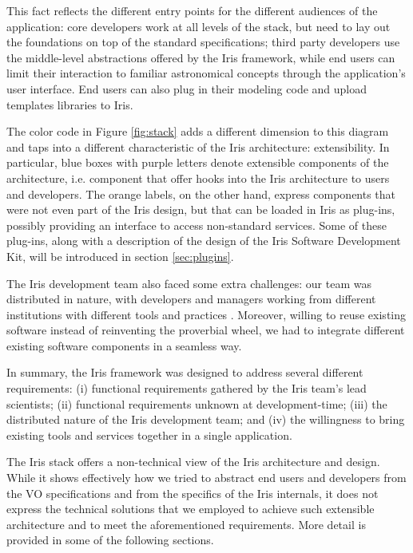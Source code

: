 \documentclass[5p]{elsarticle}
\begin{document}
This fact reflects the different entry points for the different audiences of the application: core developers work at all levels of the stack, but need to lay out the foundations on top of the standard specifications; third party developers use the middle-level abstractions offered by the Iris framework, while end users can limit their interaction to familiar astronomical concepts through the application's user interface. End users can also plug in their modeling code and upload templates libraries to Iris.

The color code in Figure \ref{fig:stack} adds a different dimension to this diagram and taps into a different characteristic of the Iris architecture: extensibility. In particular, blue boxes with purple letters denote extensible components of the architecture, i.e. component that offer hooks into the Iris architecture to users and developers. The orange labels, on the other hand, express components that were not even part of the Iris design, but that can be loaded in Iris as plug-ins, possibly providing an interface to access non-standard services. Some of these plug-ins, along with a description of the design of the Iris Software Development Kit, will be introduced in section \ref{sec:plugins}.

The Iris development team also faced some extra challenges: our team was distributed in nature, with developers and managers working from different institutions with different tools and practices \citep{2012SPIE.8449E..0IE}. Moreover, willing to reuse existing software instead of reinventing the proverbial wheel, we had to integrate different existing software components in a seamless way.

In summary, the Iris framework was designed to address several different requirements: (i) functional requirements gathered by the Iris team's lead scientists; (ii) functional requirements unknown at development-time; (iii) the distributed nature of the Iris development team; and (iv) the willingness to bring existing tools and services together in a single application.

The Iris stack offers a non-technical view of the Iris architecture and design. While it shows effectively how we tried to abstract end users and developers from the VO specifications and from the specifics of the Iris internals, it does not express the technical solutions that we employed to achieve such extensible architecture and to meet the aforementioned requirements. More detail is provided in some of the following sections.
\end{document}
